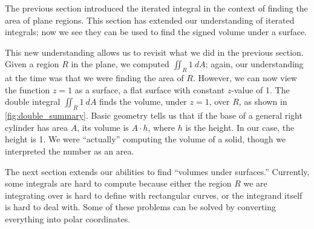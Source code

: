 The previous section introduced the iterated integral in the context of finding the area of plane regions. This section has extended our understanding of iterated integrals; now we see they can be used to find the signed volume under a surface. 

This new understanding allows us to revisit what we did in the previous section. Given a region $R$ in the plane, we computed $\iint_R 1\ dA$; again, our understanding at the time was that we were finding the area of $R$. However, we can now view the function $z=1$ as a surface, a flat surface with constant $z$-value of 1. The double integral $\iint_R 1\ dA$ finds the volume, under $z=1$, over $R$, as shown in \autoref{fig:double_summary}. Basic geometry tells us that if the base of a general right cylinder has area $A$, its volume is $A\cdot h$, where $h$ is the height. In our case, the height is 1. We were ``actually'' computing the volume of a solid, though we interpreted the number as an area.


The next section extends our abilities to find ``volumes under surfaces.'' Currently, some integrals are hard to compute because either the region $R$ we are integrating over is hard to define with rectangular curves, or the integrand itself is hard to deal with. Some of these problems can be solved by converting everything into polar coordinates.


